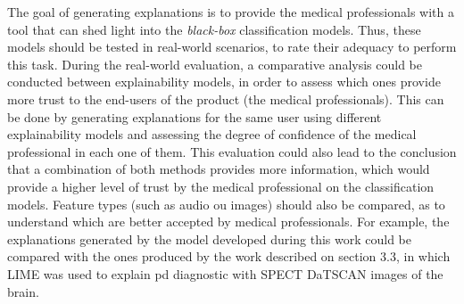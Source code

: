 The goal of generating explanations is to provide the medical professionals with a tool that can shed light into the \textit{black-box} classification models. Thus, these models should be tested in real-world scenarios, to rate their adequacy to perform this task. During the real-world evaluation, a comparative analysis could be conducted between explainability models, in order to assess which ones provide more trust to the end-users of the product (the medical professionals). This can be done by generating explanations for the same user using different explainability models and assessing the degree of confidence of the medical professional in each one of them. This evaluation could also lead to the conclusion that a combination of both methods provides more information, which would provide a higher level of trust by the medical professional on the classification models. Feature types (such as audio ou images) should also be compared, as to understand which are better accepted by medical professionals. For example, the explanations generated by the model developed during this work could be compared with the ones produced by the work described on section 3.3, in which LIME was used to explain \gls{pd} diagnostic with SPECT DaTSCAN images of the brain.

